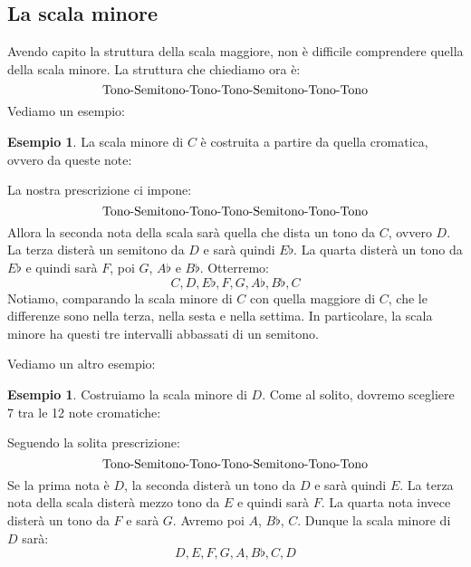 \documentclass[12pt,a4paper]{book}
\theoremstyle{definition}
\theoremstyle{Theorem}
\theoremstyle{definition}
\newtheorem{Ex}[Def]{Esempio}
\theoremstyle{definition}
\theoremstyle{definition}
\begin{document}
	 		 \subsection{La scala minore}
	 		 Avendo capito la struttura della scala maggiore, non è difficile comprendere quella della scala minore. La struttura che chiediamo ora è:
	 		 $$\hbox{Tono-Semitono-Tono-Tono-Semitono-Tono-Tono}$$
	 		 Vediamo un esempio:
	 		 \begin{Ex}
	 		 	La scala minore di $C$ è costruita a partire da quella cromatica, ovvero da queste note:
	 		 	\begin{center}
	 		 	\end{center}
	 		 	La nostra prescrizione ci impone:
	 		 	$$\hbox{Tono-Semitono-Tono-Tono-Semitono-Tono-Tono}$$
	 		 	Allora la seconda nota della scala sarà quella che dista un tono da $C$, ovvero $D$. La terza disterà un semitono da $D$ e sarà quindi $E\flat$. La quarta disterà un tono da $E\flat$ e quindi sarà $F$, poi $G$, $A\flat$ e $B\flat$. Otterremo:
	 		 	$$C,D,E\flat,F,G,A\flat,B\flat,C$$
	 		 	Notiamo, comparando la scala minore di $C$ con quella maggiore di $C$, che le differenze sono nella terza, nella sesta e nella settima. In particolare, la scala minore ha questi tre intervalli abbassati di un semitono.
	 		 \end{Ex}
	 		 Vediamo un altro esempio:
	 		 \begin{Ex}
	 		 	Costruiamo la scala minore di $D$. Come al solito, dovremo scegliere 7 tra le 12 note cromatiche:
	 		 	\begin{center}
	 		 	\end{center}
	 		 	Seguendo la solita prescrizione:
	 		 		$$\hbox{Tono-Semitono-Tono-Tono-Semitono-Tono-Tono}$$
	 		 		Se la prima nota è $D$, la seconda disterà un tono da $D$ e sarà quindi $E$. La terza nota della scala disterà mezzo tono da $E$ e quindi sarà $F$. La quarta nota invece disterà un tono da $F$ e sarà $G$. Avremo poi $A$, $B\flat$, $C$. Dunque la scala minore di $D$ sarà:
	 		 		$$D,E,F,G,A,B\flat,C,D$$
	 		 \end{Ex}
\end{document}
